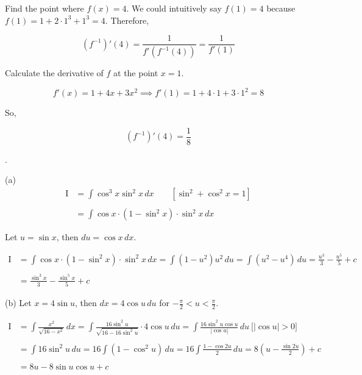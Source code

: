 \documentclass{article}
\begin{document}
\hfill

\noindent Find the point where $f(x)=4$. We could intuitively say $f(1)=4$ because $f(1)=1+2\cdot1^3+1^3=4$. Therefore,

\[(f^{-1})'\left(4\right)=\frac1{f'\left(f^{-1}(4)\right)}=\frac1{f'(1)}\]

\hfill

\noindent Calculate the derivative of $f$ at the point $x=1$.

\[f'(x)=1+4x+3x^2\implies f'(1)=1+4\cdot1+3\cdot1^2=8\]

\hfill

\noindent So,

\[(f^{-1})'\left(4\right)=\boxed{\frac18}\]

\newpage

.

\hfill

\noindent (a)
\begin{align*}
\mathrm{I}&=\int\cos^3x\sin^2x\,dx\qquad\left[\sin^2+\cos^2x=1\right]\\\\&=\int\cos x\cdot\left(1-\sin^2x\right)\cdot\sin^2x\,dx
\end{align*}

\noindent Let $u=\sin x$, then $du=\cos x\,dx$.

\hfill

\begin{align*}
\mathrm{I}&=\int\cos x\cdot\left(1-\sin^2x\right)\cdot\sin^2x\,dx=\int\left(1-u^2\right) u^2\,du=\int\left(u^2-u^4\right)\,du=\frac{u^3}3-\frac{u^5}5+c\\\\&=\boxed{\frac{\sin^3x}3-\frac{\sin^5x}5+c}
\end{align*}

\hfill

\noindent (b) Let $x=4\sin u$, then $dx=4\cos u\,du$ for $\displaystyle -\frac\pi2<u<\frac\pi2$.

\begin{align*}
\mathrm{I}&=\int\frac{x^2}{\sqrt{16-x^2}}\,dx=\int\frac{16\sin^2u}{\sqrt{16-16\sin^2u}}\cdot4\cos u\,du=\int\frac{16\sin^2u\cos u}{\left|\cos u\right|}\,du\:\bigg[\left|\cos u\right|>0\bigg]\\\\&=\int16\sin^2u\,du=16\int\left(1-\cos^2u\right)\,du=16\int\frac{1-\cos2u}2\,du=8\left(u-\frac{\sin2u}2\right)+c\\\\&=8u-8\sin u\cos u+c
\end{align*}
\end{document}
